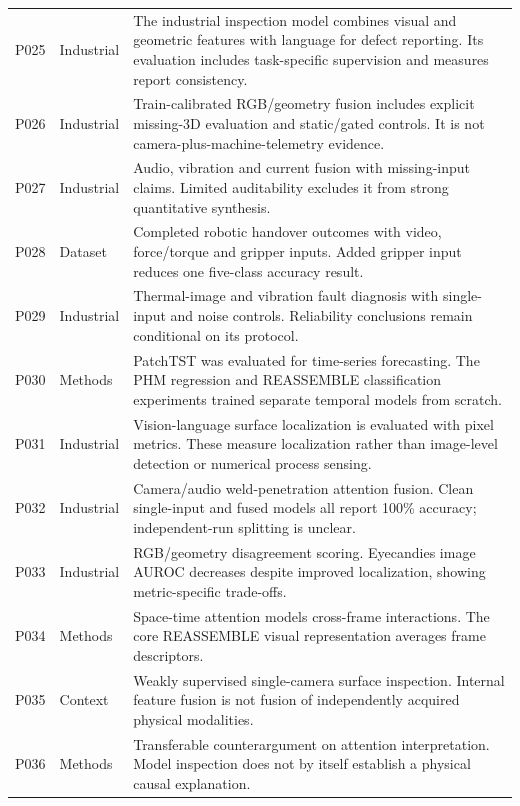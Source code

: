 \begin{longtable}{@{}P{.25\textwidth}P{.16\textwidth}P{.53\textwidth}@{}}
P025 \citep{P025} & Industrial & The industrial inspection model combines visual and geometric features with language for defect reporting. Its evaluation includes task-specific supervision and measures report consistency. \\
P026 \citep{P026} & Industrial & Train-calibrated RGB/geometry fusion includes explicit missing-3D evaluation and static/gated controls. It is not camera-plus-machine-telemetry evidence. \\
P027 \citep{P027} & Industrial & Audio, vibration and current fusion with missing-input claims. Limited auditability excludes it from strong quantitative synthesis. \\
P028 \citep{Thoduka2024Handover} & Dataset & Completed robotic handover outcomes with video, force/torque and gripper inputs. Added gripper input reduces one five-class accuracy result. \\
P029 \citep{Huo2022Multisensor} & Industrial & Thermal-image and vibration fault diagnosis with single-input and noise controls. Reliability conclusions remain conditional on its protocol. \\
P030 \citep{Nie2023PatchTST} & Methods & PatchTST was evaluated for time-series forecasting. The PHM regression and REASSEMBLE classification experiments trained separate temporal models from scratch. \\
P031 \citep{P031} & Industrial & Vision-language surface localization is evaluated with pixel metrics. These measure localization rather than image-level detection or numerical process sensing. \\
P032 \citep{Hua2026Weld} & Industrial & Camera/audio weld-penetration attention fusion. Clean single-input and fused models all report 100\% accuracy; independent-run splitting is unclear. \\
P033 \citep{P033} & Industrial & RGB/geometry disagreement scoring. Eyecandies image AUROC decreases despite improved localization, showing metric-specific trade-offs. \\
P034 \citep{P034} & Methods & Space-time attention models cross-frame interactions. The core REASSEMBLE visual representation averages frame descriptors. \\
P035 \citep{P035} & Context & Weakly supervised single-camera surface inspection. Internal feature fusion is not fusion of independently acquired physical modalities. \\
P036 \citep{P036} & Methods & Transferable counterargument on attention interpretation. Model inspection does not by itself establish a physical causal explanation. \\

\end{longtable}
